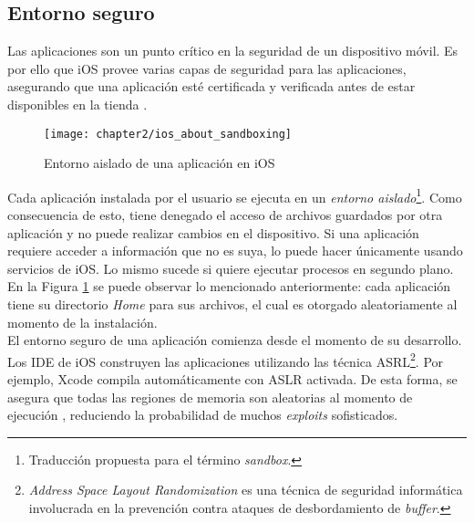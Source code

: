 \subsection{Entorno seguro}
Las aplicaciones son un punto crítico en la seguridad de un dispositivo móvil. Es por ello que iOS provee varias capas de seguridad para las aplicaciones, asegurando que una aplicación esté certificada y verificada antes de estar disponibles en la tienda \cite{asg}.\\
\begin{figure}[hbtp]
	\centering
	\texttt{[image: chapter2/ios\_about\_sandboxing]}
    \caption{Entorno aislado de una aplicación en iOS \cite{iosdl}} 
    \label{fig:ch02:sandboxing}
\end{figure}
Cada aplicación instalada por el usuario se ejecuta en un \emph{entorno aislado}\footnote{Traducción propuesta para el término \textit{sandbox}.}. Como consecuencia de esto, tiene denegado el acceso de archivos guardados por otra aplicación y no puede realizar cambios en el dispositivo. Si una aplicación requiere acceder a información que no es suya, lo puede hacer únicamente usando servicios de iOS. Lo mismo sucede si quiere ejecutar procesos en segundo plano. En la Figura \ref{fig:ch02:sandboxing} se puede observar lo mencionado anteriormente: cada aplicación tiene su directorio \textit{Home} para sus archivos, el cual es otorgado aleatoriamente al momento de la instalación.\\
El entorno seguro de una aplicación comienza desde el momento de su desarrollo. Los IDE de iOS construyen las aplicaciones utilizando las técnica ASRL\footnote{\textit{Address Space Layout Randomization} es una técnica de seguridad informática involucrada en la prevención contra ataques de desbordamiento de \textit{buffer}.}. Por ejemplo, Xcode compila automáticamente con ASLR activada. De esta forma, se asegura que todas las regiones de memoria son aleatorias al momento de ejecución \cite{asg}, reduciendo la probabilidad de muchos \textit{exploits} sofisticados.
